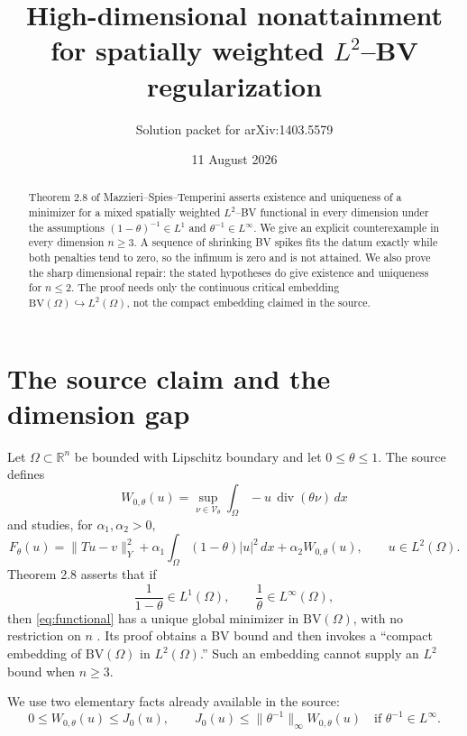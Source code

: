 \documentclass[11pt]{article}
\title{High-dimensional nonattainment for spatially weighted \(L^2\)--BV regularization}
\author{Solution packet for arXiv:1403.5579}
\date{11 August 2026}
\newcommand{\R}{\mathbb R}
\newcommand{\BV}{\mathrm{BV}}
\newcommand{\TV}{J_0}
\newcommand{\W}{W_{0,\theta}}
\newcommand{\F}{F_\theta}
\begin{document}
\maketitle

\begin{abstract}
Theorem 2.8 of Mazzieri--Spies--Temperini asserts existence and uniqueness of
a minimizer for a mixed spatially weighted \(L^2\)--BV functional in every
dimension under the assumptions \((1-\theta)^{-1}\in L^1\) and
\(\theta^{-1}\in L^\infty\).  We give an explicit counterexample in every
dimension \(n\ge3\).  A sequence of shrinking BV spikes fits the datum
exactly while both penalties tend to zero, so the infimum is zero and is not
attained.  We also prove the sharp dimensional repair: the stated hypotheses
do give existence and uniqueness for \(n\le2\).  The proof needs only the
continuous critical embedding \(\BV(\Omega)\hookrightarrow L^2(\Omega)\),
not the compact embedding claimed in the source.
\end{abstract}

\section{The source claim and the dimension gap}

Let \(\Omega\subset\R^n\) be bounded with Lipschitz boundary and let
\(0\le\theta\le1\).  The source defines
\[
 \W(u)=\sup_{\nu\in\mathcal V_\theta}
       \int_\Omega-u\,\operatorname{div}(\theta\nu)\,dx
\]
and studies, for \(\alpha_1,\alpha_2>0\),
\begin{equation}\label{eq:functional}
 \F(u)=\|Tu-v\|_Y^2
 +\alpha_1\int_\Omega(1-\theta)|u|^2\,dx
 +\alpha_2\W(u),\qquad u\in L^2(\Omega).
\end{equation}
Theorem 2.8 asserts that if
\begin{equation}\label{eq:source-hyp}
 \frac1{1-\theta}\in L^1(\Omega),
 \qquad \frac1\theta\in L^\infty(\Omega),
\end{equation}
then \eqref{eq:functional} has a unique global minimizer in
\(\BV(\Omega)\), with no restriction on \(n\) \cite{source}.  Its proof
obtains a BV bound and then invokes a ``compact embedding of
\(\BV(\Omega)\) in \(L^2(\Omega)\).''  Such an embedding cannot supply an
\(L^2\) bound when \(n\ge3\).

We use two elementary facts already available in the source:
\begin{equation}\label{eq:comparison}
 0\le \W(u)\le \TV(u),
 \qquad
 \TV(u)\le \|\theta^{-1}\|_\infty\W(u)
 \quad\text{if }\theta^{-1}\in L^\infty.
\end{equation}
\end{document}
